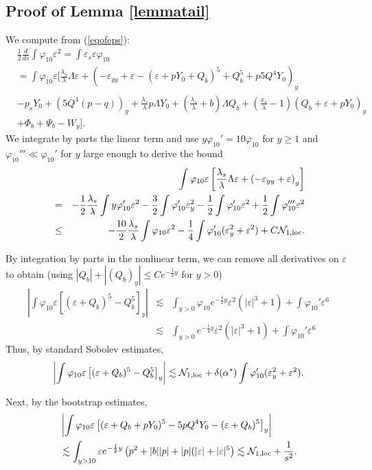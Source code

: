 \documentclass[11pt,a4paper,reqno]{amsart}
\theoremstyle{remark}
\numberwithin{equation}{section}
\newcommand{\bee}{\begin{eqnarray*}}
\newcommand{\eee}{\end{eqnarray*}}
\def\fref#1{{\rm (\ref{#1})}}
\def\e{\varepsilon}
\def\fref#1{{\rm (\ref{#1})}}
\def\lsl{\frac{\lambda_s}{\lambda}}
\def\lsl{\frac{\lambda_s}{\lambda}}
\def\Yz{Y_0}
\begin{document}
\subsection{Proof of Lemma \ref{lemmatail}} 
We compute from \fref{eqofeps}:
\begin{align*}
&\frac 12\frac{d}{ds}\int\varphi_{10}\e^2  =   \int \e_s \e \varphi_{10}\\
&=\int\varphi_{10}\e\bigg[\lsl\Lambda \e+\left(-\varepsilon_{yy} + \varepsilon - (\varepsilon +p\Yz +Q_b )^5 + Q_b ^5 +p5 Q^4 \Yz\right)_y      \\
   &      - p_s \Yz + (5Q^4(p-q))_y +\lsl p \Lambda \Yz+\left(\frac {{\lambda}_{s}}{{\lambda}}+{b}\right) {\Lambda} Q_b
+ \left(\frac { x_{{s}}}{\lambda} -1\right) (Q_b  + \varepsilon +p\Yz)_y \\
& + \Phi_{{b}} + \Psi_{{b}} -W_y\bigg].
\end{align*}
We integrate by parts the linear term and use $y\varphi_{10}'={10}\varphi_{10}$ for $y\geq 1$ and $\varphi_{10}'''\ll \varphi_{10}'$ for $y$ large enough to derive the bound
\bee
&&\int\varphi_{10}\e\left[\lsl\Lambda \e+\left(-\varepsilon_{yy} + \varepsilon\right)_y\right] 
\\& = & -\frac12\lsl\int y\varphi_{10}'\e^2-\frac 32\int\varphi_{10}'\e_y^2-\frac12\int\varphi'_{10}\e^2+\frac 12\int\varphi_{10}'''\e^2\\
& \leq & -\frac{10}2\lsl\int \varphi_{10}\e^2-\frac 14\int\varphi_{10}'(\e_y^2+\e^2)+C\mathcal N_{1,\rm loc}.
\eee


 By integration by parts in the nonlinear term, we can remove all derivatives on $\e$ to obtain
 (using $|Q_b|+|(Q_b)_y|\leq Ce^{-\frac 12 {y}}$ for $y>0$) 
\bee
 \left|\int\varphi_{10}\e \left[(\varepsilon +Q_b )^5 -Q_b ^5\right]_y\right| 
&\lesssim & \int_{y>0} \varphi_{10}e^{-\frac 12 {y}}\e^2(|\e|^3 +1) +\int\varphi_{10}'\e^6\\
&  \lesssim &  \int_{y>0} e^{-\frac 14 {y}} \e^2(|\e|^3 +1)+\int\varphi_{10}'\e^6\eee
Thus, by standard Sobolev estimates,
\bee
 \left|\int\varphi_{10}\e \left[(\varepsilon +Q_b )^5 -Q_b ^5\right]_y\right|  
 \lesssim \mathcal N_{1,\rm loc} +\delta(\alpha^*)\int\varphi'_{10}(\e_y^2+\e^2).
\eee

Next, by the bootstrap estimates,
\begin{align*}
& \left| \int \varphi_{10} \e \left[ (\e + Q_b +p\Yz)^5 - 5 p Q^4 \Yz - (\e+Q_b)^5\right]_y\right| \\
& \lesssim \int_{y>10}   \e   e^{-\frac 12 y}\left(p^2 + |b||p| + |p| (|\e|+|\e|^5 \right)
\lesssim \mathcal N_{1,\rm loc} +\frac 1{s^2}.
\end{align*}
\end{document}
